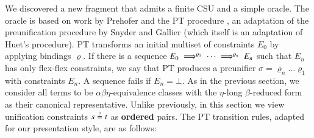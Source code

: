 We discovered a new fragment that admits a finite CSU and a simple oracle. The
oracle is based on work by Prehofer and the PT procedure \cite{cp-95-unifphd},
an adaptation of the preunification procedure by Snyder and Gallier
\cite{sg-89-unif} (which itself is an adaptation of Huet's procedure). PT
transforms an initial multiset of constraints $E_0$ by applying bindings
$\varrho$. If there is a sequence
$E_0\;\Longrightarrow^{\varrho_1}\;\cdots\;\Longrightarrow^{\varrho_n}\;E_n$ such that $E_n$ has only
flex-flex constraints, we say that PT produces a preunifier $\sigma =
\varrho_n\ldots\varrho_1$ with constraints $E_n$. A sequence fails if
$E_n=\bot$. As in the previous section, we consider all terms to be
$\alpha\beta\eta$-equivalence classes with the $\eta$-long $\beta$-reduced form
as their canonical representative. Unlike previously, in this section we view
unification constraints $s \unif t$ as {\bf ordered} pairs. The PT transition rules, adapted for our presentation style, are as
follows:
